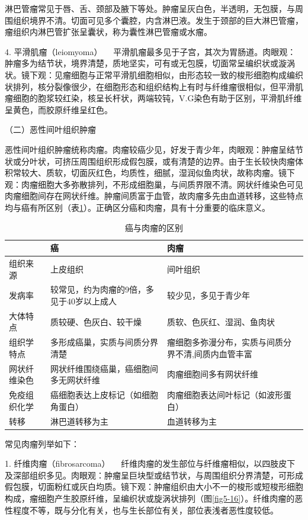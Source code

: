 淋巴管瘤常见于唇、舌、颈部及腋下等处。肿瘤呈灰白色，半透明，无包膜，与周围组织境界不清。切面可见多个囊腔，内含淋巴液。发生于颈部的巨大淋巴管瘤，瘤组织内淋巴管扩张呈囊状，称为囊性淋巴管瘤或水瘤。

{4. 平滑肌瘤（leiomyoma）}
　平滑肌瘤最多见于子宫，其次为胃肠道。肉眼观：肿瘤多为结节状，境界清楚，质地坚实，可有或无包膜，切面常呈编织状或漩涡状。镜下观：见瘤细胞与正常平滑肌细胞相似，由形态较一致的梭形细胞构成编织状排列，核分裂像很少，在细胞形态和组织结构上有时与纤维瘤很相似，但平滑肌瘤细胞的胞浆较红染，核呈长杆状，两端较钝，V.G染色有助于区别，平滑肌纤维呈黄色，而胶原纤维呈红色。

{（二）恶性间叶组织肿瘤}

恶性间叶组织肿瘤统称肉瘤。肉瘤较癌少见，好发于青少年，肉眼观：肿瘤呈结节状或分叶状，可挤压周围组织形成假包膜，或有清楚的边界。由于生长较快肉瘤体积常较大、质软，切面灰红色，均质性，细腻，湿润似鱼肉状，故称肉瘤。镜下观：肉瘤细胞大多弥散排列，不形成细胞巢，与间质界限不清。网状纤维染色可见肉瘤细胞间存在网状纤维。肿瘤间质富于血管，故肉瘤多先由血道转移，这些特点均与癌有所区别（表\ref{tab5-4}）。正确区分癌和肉瘤，具有十分重要的临床意义。

\begin{table}[ht]
    \caption{癌与肉瘤的区别}
    \label{tab5-4}
    \centering
    \begin{tabular}{lp{5cm}p{5cm}}
    \toprule
    &癌&肉瘤\\
    \midrule
    组织来源&上皮组织&间叶组织\\
    发病率&较常见，约为肉瘤的9倍，多见于40岁以上成人
    &较少见，多见于青少年\\
    大体特点&质较硬、色灰白、较干燥&质软、色灰红、湿润、鱼肉状\\
    组织学特点&多形成癌巢，实质与间质分界清楚&瘤细胞多弥漫分布，实质与间质分界不清,间质内血管丰富\\
    网状纤维染色&网状纤维围绕癌巢，癌细胞间多无网状纤维&肉瘤细胞间多有网状纤维\\
    免疫组织化学&癌细胞表达上皮标记（如细胞角蛋白）&肉瘤细胞表达间叶标记（如波形蛋白）\\
    转移&淋巴道转移为主&血道转移为主\\
    \bottomrule
    \end{tabular}
  \end{table}

常见肉瘤列举如下：

{1. 纤维肉瘤（fibrosarcoma）}
　纤维肉瘤的发生部位与纤维瘤相似，以四肢皮下及深部组织多见。肉眼观：肿瘤呈巨块型或结节状，与周围组织分界清楚，可形成假包膜，切面粉红或灰白均质。镜下观：肿瘤组织由大小不一的梭形或短梭形细胞构成，瘤细胞产生胶原纤维，呈编织状或旋涡状排列（图\ref{fig5-16}）。纤维肉瘤的恶性程度不等，既与分化有关，也与生长部位有关，部位表浅者恶性度较低。

